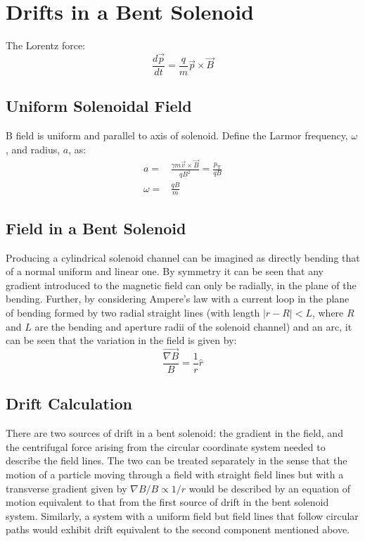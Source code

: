 \chapter{Drifts in a Bent Solenoid}
The Lorentz force:
\begin{equation}
\frac{d\vec{p}}{dt}=\frac{q}{m}\vec{p}\times\vec{B}
\end{equation}

\section{Uniform Solenoidal Field}
B field is uniform and parallel to axis of solenoid.
Define the Larmor frequency, $\omega$, and radius, $a$, as:
\begin{align}
a=&\frac{\gamma m \vec{v}\times\vec{B}}{qB^2} = \frac{p_\mathrm{T}}{qB} \\
\omega=&\frac{qB}{m}
\end{align}

\section{Field in a Bent Solenoid}
Producing a cylindrical solenoid  channel can be imagined as directly bending that of a normal uniform and linear one.
By symmetry it can be seen that any gradient introduced to the magnetic field can only be radially, in the plane of the bending.
Further, by considering Ampere's law with a current loop in the plane of bending formed by two radial straight lines (with length $|r-R|<L$, where $R$ and $L$ are the bending and aperture radii of the solenoid channel) and an arc,
it can be seen that the variation in the field is given by:
\begin{equation}
\frac{\vec{\nabla B}}{B}=\frac{1}{r}\hat{r}
\end{equation}

\section{Drift Calculation}
There are two sources of drift in a bent solenoid: the gradient in the field, and the centrifugal force arising from the circular coordinate system needed to describe the field lines.
The two can be treated separately in the sense that the motion of a particle moving through a field with straight field lines but with a transverse gradient given by $\nabla B/ B \propto 1/r$ would be described by an equation of motion equivalent to that from the first source of drift in the bent solenoid system. 
Similarly, a system with a uniform field but field lines that follow circular paths would exhibit drift equivalent to the second component mentioned above.

